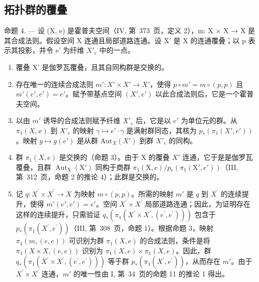 \subsection{拓扑群的覆叠}

命题 4. --- 设 (X, e) 是霍普夫空间（IV, 第~373~页，定义 2），m: X × X → X 是其合成法则。假设空间 X 连通且局部道路连通。设 X' 是 X 的连通覆叠；以 p 表示其投影，并令 e' 为纤维 \(X'_{e}\) 中的一点。

\begin{enumerate}
\def\labelenumi{\alph{enumi})}
\item
  覆叠 X' 是伽罗瓦覆叠，且其自同构群是交换的。
\item
  存在唯一的连续合成法则 \(m' \colon X' \times X' \to X'\)，使得 \(p \circ m' = m \circ (p, p)\) 且 \(m'(e', e') = e'\)。赋予带基点空间 \((X', e')\) 以此合成法则后，它是一个霍普夫空间。
\item
  以由 \(m'\) 诱导的合成法则赋予纤维 \(X'_e\) 后，它是以 \(e'\) 为单位元的群。从 \(\pi_1(X, x)\) 到 \(X'_e\) 的映射 \(\gamma \mapsto e' \cdot \gamma\) 是满射群同态，其核为 \(p_*(\pi_1(X', e'))\)。映射 \(g \mapsto g(e')\) 是从群 \(\text{Aut}_X(X')\) 到群 \(X'_e\) 的同构。
\item
  群 \(\pi_{1}(X,e)\) 是交换的（命题 3）。由于 X 的覆叠 \(X'\) 连通，它于是是伽罗瓦覆叠，且群 \(\operatorname{Aut}_{\mathrm{X}}(\mathrm{X}')\) 同构于商群 \(\pi_{1}(\mathrm{X},e)/p_{*}(\pi_{1}(\mathrm{X}',e'))\)（III, 第~312~页，命题 2 的推论 4）；此群是交换的。
\item
  记 \(q\colon X^{\prime}\times X^{\prime}\to X\) 为映射 \(m\circ (p,p)\)。所需的映射 \(m'\) 是 \(q\) 到 \(X^{\prime}\) 的连续提升，使得 \(m'(e',e') = e'\)。空间 \(X^{\prime}\times X^{\prime}\) 局部道路连通；因此，为证明存在这样的连续提升，只需验证 \(q_{*}(\pi_{1}(X^{\prime}\times X^{\prime},(e^{\prime},e^{\prime})))\) 包含于 \(p_{*}(\pi_{1}(X^{\prime},e^{\prime}))\)（III, 第~308~页，命题 1）。根据命题 3，映射 \(\pi_1(m,(e,e))\) 可识别为群 \(\pi_1(X,e)\) 的合成法则，条件是将 \(\pi_1(X\times X,(e,e))\) 识别为 \(\pi_1(X,e)\times \pi_1(X,e)\)。因此，群 \(q_{*}(\pi_{1}(X^{\prime}\times X^{\prime},(e^{\prime},e^{\prime})))\) 等于群 \(p_{*}(\pi_{1}(X^{\prime},e^{\prime}))\)，从而存在 \(m'\)。由于 \(X^{\prime}\times X^{\prime}\) 连通，\(m'\) 的唯一性由 I, 第~34~页的命题 11 的推论 1 得出。
\end{enumerate}

